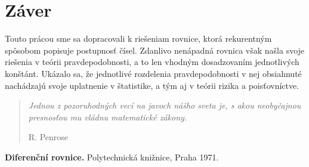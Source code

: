 \documentclass[a4paper,10pt]{article}
\theoremstyle{plain}
\theoremstyle{definition}
\begin{document}
\section{Záver}
Touto  prácou sme sa dopracovali k riešeniam rovnice, ktorá rekurentným spôsobom popisuje postupnosť čísel. Zdanlivo nenápadná rovnica však našla svoje riešenia v teórii pravdepodobnosti, a to len vhodným dosadzovaním jednotlivých konštánt. Ukázalo sa, že jednotlivé rozdelenia pravdepodobnosti v nej obsiahnuté nachádzajú svoje uplatnenie v štatistike, a tým aj v teórii rizika a poisťovníctve.

\begin{quote}
\textit{Jednou z pozoruhodných vecí na javoch nášho sveta je, s akou neobyčajnou presnosťou mu vládnu matematické zákony.}

\hfill R. Penrose 

\end{quote}

\begin{thebibliography}{9}
               {\bf Diferenční rovnice.}
           Polytechnická knižnice, Praha 1971.
\end{thebibliography}
\end{document}
